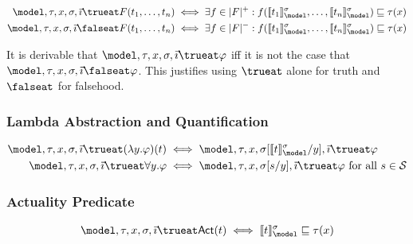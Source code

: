 \documentclass[../LogosReference.tex]{subfiles}
\begin{document}
\begin{definition}\label{def:atomic-truth}
	\begin{align}
		\model, \history, x, \assignment, \tempindex \trueat F(t_1, \ldots, t_n)  & \iff \exists f \in \verifierset{F} : f(\sem{t_1}^\assignment_\model, \ldots, \sem{t_n}^\assignment_\model) \parthood \history(x)  \\
		\model, \history, x, \assignment, \tempindex \falseat F(t_1, \ldots, t_n) & \iff \exists f \in \falsifierset{F} : f(\sem{t_1}^\assignment_\model, \ldots, \sem{t_n}^\assignment_\model) \parthood \history(x)
	\end{align}
\end{definition}

\begin{remark}
	It is derivable that $\model, \history, x, \assignment, \tempindex \trueat \metaA$ iff it is not the case that $\model, \history, x, \assignment, \tempindex \falseat \metaA$.
	This justifies using $\trueat$ alone for truth and $\falseat$ for falsehood.
\end{remark}

\subsubsection{Lambda Abstraction and Quantification}

\begin{definition}\label{def:lambda-quant-truth}
	\begin{align}
		\model, \history, x, \assignment, \tempindex \trueat (\lambda y.\metaA)(t) & \iff \model, \history, x, \assignsub{\sem{t}^\assignment_\model}{y}, \tempindex \trueat \metaA           \\
		\model, \history, x, \assignment, \tempindex \trueat \forall y.\metaA      & \iff \model, \history, x, \assignsub{s}{y}, \tempindex \trueat \metaA \text{ for all } s \in \statespace
	\end{align}
\end{definition}

\subsubsection{Actuality Predicate}

\begin{definition}[Actuality]\label{def:actuality-truth}
	\[
		\model, \history, x, \assignment, \tempindex \trueat \actual(t) \iff \sem{t}^\assignment_\model \parthood \history(x)
	\]
\end{definition}
\end{document}
